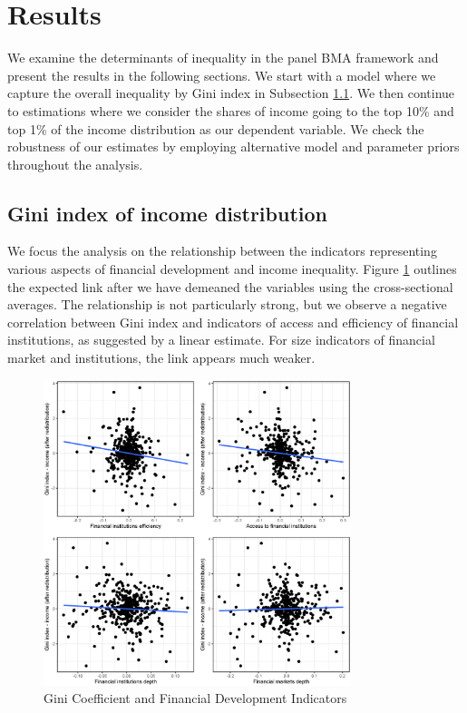 \documentclass[preprint, nonatbib, 10pt]{elsarticle}
\begin{document}
\section{Results}
\label{sec:results}
We examine the determinants of inequality in the panel \ac{BMA} framework and present the results in the following sections. We start with a model where we capture the overall inequality by Gini index in Subsection \ref{subsec:gini}. We then continue to estimations where we consider the shares of income going to the top 10\% and top 1\% of the income distribution as our dependent variable. We check the robustness of our estimates by employing alternative model and parameter priors throughout the analysis.

\subsection{Gini index of income distribution}\label{subsec:gini}
We focus the analysis on the relationship between the indicators representing various aspects of financial development and income inequality. Figure \ref{fig:gini_findev_dm} outlines the expected link after we have demeaned the variables using the cross-sectional averages. The relationship is not particularly strong, but we observe a negative correlation between Gini index and indicators of access and efficiency of financial institutions, as suggested by a linear estimate. For size indicators of financial market and institutions, the link appears much weaker.

\begin{figure}[ht!]
  \caption{Gini Coefficient and Financial Development Indicators}
  \label{fig:gini_findev_dm}
  \centering
  \includegraphics[width=0.8\textwidth, keepaspectratio]{figures//plots_findev_gini_dm}
\end{figure}
\end{document}
